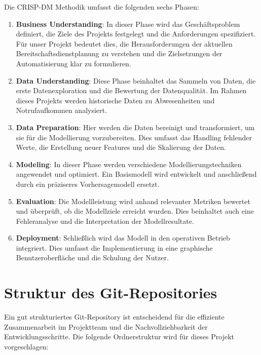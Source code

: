\documentclass[%
pdftex,
oneside,			%
11pt,				%
parskip=half,		%
headheight = 12pt,	%
headsepline,		%
footsepline,		%
footheight = 16pt,	%
abstracton,		%
DIV=calc,		%
BCOR=8mm,		%
headinclude=false,	%
footinclude=false,	%
listof=totoc,		%
toc=bibliography,	%
]{scrreprt}	%
\begin{document}
        Die CRISP-DM Methodik umfasst die folgenden sechs Phasen:

        \begin{enumerate}
            \item \textbf{Business Understanding}: In dieser Phase wird das Geschäftsproblem definiert, die Ziele des Projekts festgelegt und die Anforderungen spezifiziert. 
            Für unser Projekt bedeutet dies, die Herausforderungen der aktuellen Bereitschaftsdienstplanung zu verstehen und die Zielsetzungen der Automatisierung klar zu formulieren.
            \item \textbf{Data Understanding}: Diese Phase beinhaltet das Sammeln von Daten, die erste Datenexploration und die Bewertung der Datenqualität. 
            Im Rahmen dieses Projekts werden historische Daten zu Abwesenheiten und Notrufaufkommen analysiert.
            \item \textbf{Data Preparation}: Hier werden die Daten bereinigt und transformiert, um sie für die Modellierung vorzubereiten. 
            Dies umfasst das Handling fehlender Werte, die Erstellung neuer Features und die Skalierung der Daten.
            \item \textbf{Modeling}: In dieser Phase werden verschiedene Modellierungstechniken angewendet und optimiert. 
            Ein Basismodell wird entwickelt und anschließend durch ein präziseres Vorhersagemodell ersetzt.
            \item \textbf{Evaluation}: Die Modellleistung wird anhand relevanter Metriken bewertet und überprüft, ob die Modellziele erreicht wurden. 
            Dies beinhaltet auch eine Fehleranalyse und die Interpretation der Modellresultate.
            \item \textbf{Deployment}: Schließlich wird das Modell in den operativen Betrieb integriert. 
            Dies umfasst die Implementierung in eine graphische Benutzeroberfläche und die Schulung der Nutzer.
        \end{enumerate}

    \section{Struktur des Git-Repositories}

        Ein gut strukturiertes Git-Repository ist entscheidend für die effiziente Zusammenarbeit im Projektteam und die Nachvollziehbarkeit der Entwicklungsschritte. 
        Die folgende Ordnerstruktur wird für dieses Projekt vorgeschlagen:
\end{document}
